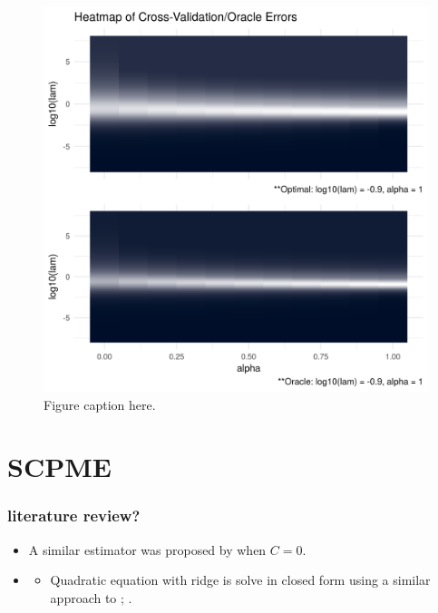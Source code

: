 \documentclass[11pt,]{report}
\providecommand{\tightlist}{%
  \setlength{\itemsep}{0pt}\setlength{\parskip}{0pt}}
\begin{document}
\begin{figure}

{\centering \includegraphics[width=0.9\linewidth,]{images/repsKLtridiag_N50_P100} 

}

\caption{Figure caption here.}\label{fig:admmsim5}
\end{figure}

\hypertarget{scpme}{%
\chapter{SCPME}\label{scpme}}

\hypertarget{literature-review-1}{%
\subsection{literature review?}\label{literature-review-1}}

\begin{itemize}
\item
  A similar estimator was proposed by \citet{dalal2017sparse} when \(C = 0\).
\item
  \begin{itemize}
  \tightlist
  \item
    Quadratic equation with ridge is solve in closed form using a similar approach to \citet{witten2009covariance}; \citet{price2015ridge}.
  \end{itemize}
\end{itemize}
\end{document}
